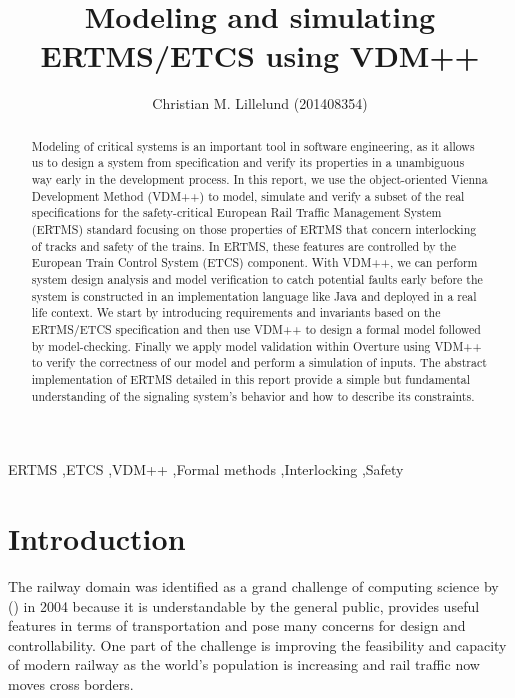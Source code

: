 \documentclass[preprint,12pt]{elsarticle}
\begin{document}
\begin{frontmatter}

\title{Modeling and simulating ERTMS/ETCS using VDM++}


\author{Christian M. Lillelund (201408354)}

\address{School of Engineering, Aarhus University}

\address{Course: E18 - Modeling of Critical Systems}

\begin{abstract}
Modeling of critical systems is an important tool in software engineering, as it allows us to design a system from specification and verify its properties in a unambiguous way early in the development process. In this report, we use the object-oriented Vienna Development Method (VDM++) to model, simulate and verify a subset of the real specifications for the safety-critical European Rail Traffic Management System (ERTMS) standard focusing on those properties of ERTMS that concern interlocking of tracks and safety of the trains. In ERTMS, these features are controlled by the European Train Control System (ETCS) component. With VDM++, we can perform system design analysis and model verification to catch potential faults early before the system is constructed in an implementation language like Java and deployed in a real life context. We start by introducing requirements and invariants based on the ERTMS/ETCS specification and then use VDM++ to design a formal model followed by model-checking. Finally we apply model validation within Overture using VDM++ to verify the correctness of our model and perform a simulation of inputs. The abstract implementation of ERTMS detailed in this report provide a simple but fundamental understanding of the signaling system's behavior and how to describe its constraints.
\end{abstract}

\begin{keyword}
ERTMS \sep ETCS \sep VDM++ \sep Formal methods \sep Interlocking \sep Safety
\end{keyword}

\end{frontmatter}

\section{Introduction}
\label{S:introduction}
The railway domain was identified as a grand challenge of computing science by (\citet{Challenge}) in 2004 because it is understandable by the general public, provides useful features in terms of transportation and pose many concerns for design and controllability. One part of the challenge is improving the feasibility and capacity of modern railway as the world's population is increasing and rail traffic now moves cross borders.
\end{document}
